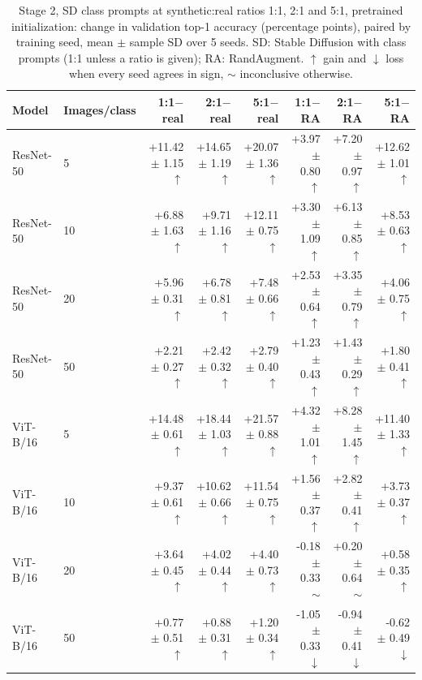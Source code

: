 \begin{table}[H]
\centering
\small
\setlength{\tabcolsep}{4pt}
\caption{Stage 2, SD class prompts at synthetic:real ratios 1:1, 2:1 and 5:1, pretrained initialization: change in validation top-1 accuracy (percentage points), paired by training seed, mean $\pm$ sample SD over 5 seeds. SD: Stable Diffusion with class prompts (1:1 unless a ratio is given); RA: RandAugment. $\uparrow$ gain and $\downarrow$ loss when every seed agrees in sign, $\sim$ inconclusive otherwise.}
\label{tab:stage2-ratio-pretrained}
\begin{tabular}{llrrrrrr}
\toprule
Model & Images/class & 1:1$-$real & 2:1$-$real & 5:1$-$real & 1:1$-$RA & 2:1$-$RA & 5:1$-$RA \\
\midrule
ResNet-50 & 5 & +11.42 $\pm$ 1.15 $\uparrow$ & +14.65 $\pm$ 1.19 $\uparrow$ & +20.07 $\pm$ 1.36 $\uparrow$ & +3.97 $\pm$ 0.80 $\uparrow$ & +7.20 $\pm$ 0.97 $\uparrow$ & +12.62 $\pm$ 1.01 $\uparrow$ \\
ResNet-50 & 10 & +6.88 $\pm$ 1.63 $\uparrow$ & +9.71 $\pm$ 1.16 $\uparrow$ & +12.11 $\pm$ 0.75 $\uparrow$ & +3.30 $\pm$ 1.09 $\uparrow$ & +6.13 $\pm$ 0.85 $\uparrow$ & +8.53 $\pm$ 0.63 $\uparrow$ \\
ResNet-50 & 20 & +5.96 $\pm$ 0.31 $\uparrow$ & +6.78 $\pm$ 0.81 $\uparrow$ & +7.48 $\pm$ 0.66 $\uparrow$ & +2.53 $\pm$ 0.64 $\uparrow$ & +3.35 $\pm$ 0.79 $\uparrow$ & +4.06 $\pm$ 0.75 $\uparrow$ \\
ResNet-50 & 50 & +2.21 $\pm$ 0.27 $\uparrow$ & +2.42 $\pm$ 0.32 $\uparrow$ & +2.79 $\pm$ 0.40 $\uparrow$ & +1.23 $\pm$ 0.43 $\uparrow$ & +1.43 $\pm$ 0.29 $\uparrow$ & +1.80 $\pm$ 0.41 $\uparrow$ \\
\midrule
ViT-B/16 & 5 & +14.48 $\pm$ 0.61 $\uparrow$ & +18.44 $\pm$ 1.03 $\uparrow$ & +21.57 $\pm$ 0.88 $\uparrow$ & +4.32 $\pm$ 1.01 $\uparrow$ & +8.28 $\pm$ 1.45 $\uparrow$ & +11.40 $\pm$ 1.33 $\uparrow$ \\
ViT-B/16 & 10 & +9.37 $\pm$ 0.61 $\uparrow$ & +10.62 $\pm$ 0.66 $\uparrow$ & +11.54 $\pm$ 0.75 $\uparrow$ & +1.56 $\pm$ 0.37 $\uparrow$ & +2.82 $\pm$ 0.41 $\uparrow$ & +3.73 $\pm$ 0.37 $\uparrow$ \\
ViT-B/16 & 20 & +3.64 $\pm$ 0.45 $\uparrow$ & +4.02 $\pm$ 0.44 $\uparrow$ & +4.40 $\pm$ 0.73 $\uparrow$ & -0.18 $\pm$ 0.33 $\sim$ & +0.20 $\pm$ 0.64 $\sim$ & +0.58 $\pm$ 0.35 $\uparrow$ \\
ViT-B/16 & 50 & +0.77 $\pm$ 0.51 $\uparrow$ & +0.88 $\pm$ 0.31 $\uparrow$ & +1.20 $\pm$ 0.34 $\uparrow$ & -1.05 $\pm$ 0.33 $\downarrow$ & -0.94 $\pm$ 0.41 $\downarrow$ & -0.62 $\pm$ 0.49 $\downarrow$ \\
\bottomrule
\end{tabular}
\end{table}
